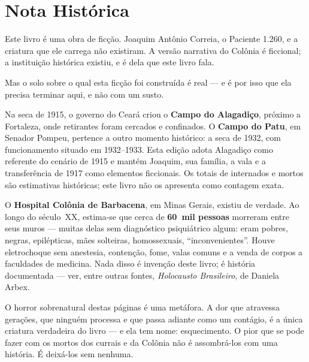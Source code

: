 \cleardoublepage
\chapter*{Nota Histórica}
\label{nota-historica}

\thispagestyle{empty}

\noindent Este livro é uma obra de ficção. Joaquim Antônio Correia, o
Paciente 1.260, e a criatura que ele carrega não existiram. A versão narrativa do Colônia é ficcional; a instituição histórica existiu, e é dela que este livro fala.

\vspace{0.8em}

\noindent Mas o solo sobre o qual esta ficção foi construída é real --- e é
por isso que ela precisa terminar aqui, e não com um susto.

\vspace{0.8em}

\noindent Na seca de 1915, o governo do Ceará criou o \textbf{Campo do
Alagadiço}, próximo a Fortaleza, onde retirantes foram cercados e
confinados. O \textbf{Campo do Patu}, em Senador Pompeu, pertence a outro
momento histórico: a seca de 1932, com funcionamento situado em
1932--1933. Esta edição adota Alagadiço como referente do cenário de 1915 e
mantém Joaquim, sua família, a vala e a transferência de 1917 como elementos
ficcionais. Os totais de internados e mortos são estimativas históricas;
este livro não os apresenta como contagem exata.

\vspace{0.8em}

\noindent O \textbf{Hospital Colônia de Barbacena}, em Minas Gerais,
existiu de verdade. Ao longo do século~XX, estima-se que cerca de
\textbf{60~mil pessoas} morreram entre seus muros --- muitas delas sem
diagnóstico psiquiátrico algum: eram pobres, negras, epilépticas, mães
solteiras, homossexuais, ``inconvenientes''. Houve eletrochoque sem
anestesia, contenção, fome, valas comuns e a venda de corpos a faculdades
de medicina. Nada disso é invenção deste livro; é história documentada ---
ver, entre outras fontes, \textit{Holocausto Brasileiro}, de Daniela Arbex.

\vspace{0.8em}

\noindent O horror sobrenatural destas páginas é uma metáfora. A dor que
atravessa gerações, que ninguém processa e que passa adiante como um
contágio, é a única criatura verdadeira do livro --- e ela tem nome:
esquecimento. O pior que se pode fazer com os mortos dos currais e da
Colônia não é assombrá-los com uma história. É deixá-los sem nenhuma.

